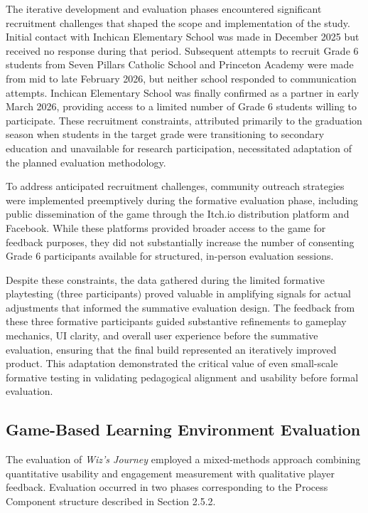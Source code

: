 The iterative development and evaluation phases encountered significant recruitment challenges that shaped the scope and implementation of the study. Initial contact with Inchican Elementary School was made in December 2025 but received no response during that period. Subsequent attempts to recruit Grade 6 students from Seven Pillars Catholic School and Princeton Academy were made from mid to late February 2026, but neither school responded to communication attempts. Inchican Elementary School was finally confirmed as a partner in early March 2026, providing access to a limited number of Grade 6 students willing to participate. These recruitment constraints, attributed primarily to the graduation season when students in the target grade were transitioning to secondary education and unavailable for research participation, necessitated adaptation of the planned evaluation methodology.

To address anticipated recruitment challenges, community outreach strategies were implemented preemptively during the formative evaluation phase, including public dissemination of the game through the Itch.io distribution platform and Facebook. While these platforms provided broader access to the game for feedback purposes, they did not substantially increase the number of consenting Grade 6 participants available for structured, in-person evaluation sessions.

Despite these constraints, the data gathered during the limited formative playtesting (three participants) proved valuable in amplifying signals for actual adjustments that informed the summative evaluation design. The feedback from these three formative participants guided substantive refinements to gameplay mechanics, UI clarity, and overall user experience before the summative evaluation, ensuring that the final build represented an iteratively improved product. This adaptation demonstrated the critical value of even small-scale formative testing in validating pedagogical alignment and usability before formal evaluation.

\subsection{Game-Based Learning Environment Evaluation}

The evaluation of \textit{Wiz's Journey} employed a mixed-methods approach combining quantitative usability and engagement measurement with qualitative player feedback. Evaluation occurred in two phases corresponding to the Process Component structure described in Section 2.5.2.


